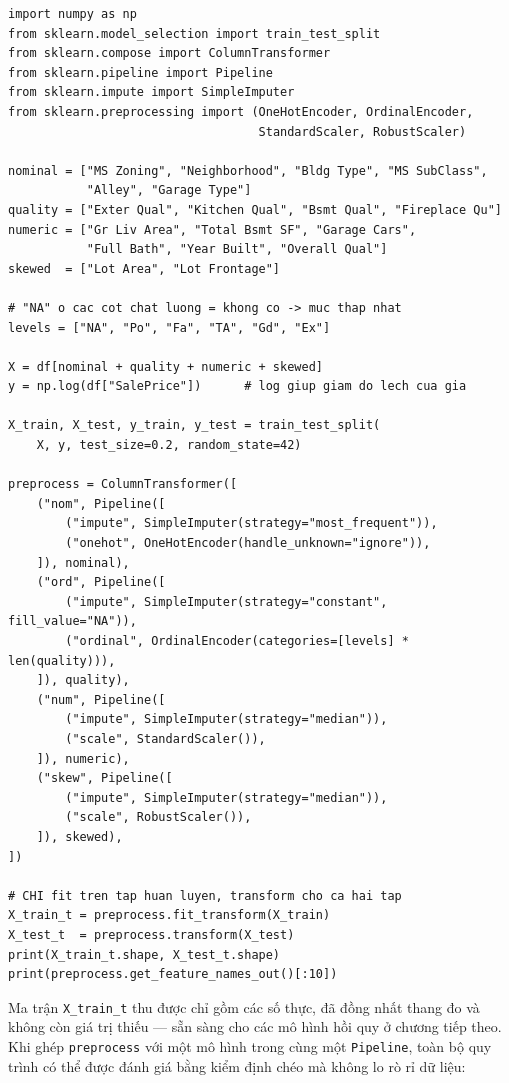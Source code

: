 \begin{lstlisting}[caption={Pipeline tiền xử lý cho Ames Housing}]
import numpy as np
from sklearn.model_selection import train_test_split
from sklearn.compose import ColumnTransformer
from sklearn.pipeline import Pipeline
from sklearn.impute import SimpleImputer
from sklearn.preprocessing import (OneHotEncoder, OrdinalEncoder,
                                   StandardScaler, RobustScaler)

nominal = ["MS Zoning", "Neighborhood", "Bldg Type", "MS SubClass",
           "Alley", "Garage Type"]
quality = ["Exter Qual", "Kitchen Qual", "Bsmt Qual", "Fireplace Qu"]
numeric = ["Gr Liv Area", "Total Bsmt SF", "Garage Cars",
           "Full Bath", "Year Built", "Overall Qual"]
skewed  = ["Lot Area", "Lot Frontage"]

# "NA" o cac cot chat luong = khong co -> muc thap nhat
levels = ["NA", "Po", "Fa", "TA", "Gd", "Ex"]

X = df[nominal + quality + numeric + skewed]
y = np.log(df["SalePrice"])      # log giup giam do lech cua gia

X_train, X_test, y_train, y_test = train_test_split(
    X, y, test_size=0.2, random_state=42)

preprocess = ColumnTransformer([
    ("nom", Pipeline([
        ("impute", SimpleImputer(strategy="most_frequent")),
        ("onehot", OneHotEncoder(handle_unknown="ignore")),
    ]), nominal),
    ("ord", Pipeline([
        ("impute", SimpleImputer(strategy="constant", fill_value="NA")),
        ("ordinal", OrdinalEncoder(categories=[levels] * len(quality))),
    ]), quality),
    ("num", Pipeline([
        ("impute", SimpleImputer(strategy="median")),
        ("scale", StandardScaler()),
    ]), numeric),
    ("skew", Pipeline([
        ("impute", SimpleImputer(strategy="median")),
        ("scale", RobustScaler()),
    ]), skewed),
])

# CHI fit tren tap huan luyen, transform cho ca hai tap
X_train_t = preprocess.fit_transform(X_train)
X_test_t  = preprocess.transform(X_test)
print(X_train_t.shape, X_test_t.shape)
print(preprocess.get_feature_names_out()[:10])
\end{lstlisting}

Ma trận \texttt{X\_train\_t} thu được chỉ gồm các số thực, đã đồng nhất thang đo và không còn giá trị thiếu --- sẵn sàng cho các mô hình hồi quy ở chương tiếp theo. Khi ghép \texttt{preprocess} với một mô hình trong cùng một \texttt{Pipeline}, toàn bộ quy trình có thể được đánh giá bằng kiểm định chéo mà không lo rò rỉ dữ liệu:

